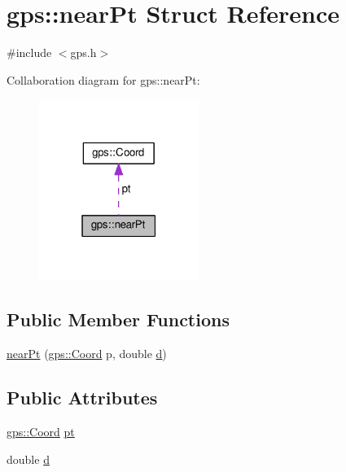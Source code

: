 \hypertarget{structgps_1_1nearPt}{}\section{gps\+:\+:near\+Pt Struct Reference}
\label{structgps_1_1nearPt}


{\ttfamily \#include $<$gps.\+h$>$}



Collaboration diagram for gps\+:\+:near\+Pt\+:\nopagebreak
\begin{figure}[H]
\begin{center}
\leavevmode
\includegraphics[width=147pt]{structgps_1_1nearPt__coll__graph}
\end{center}
\end{figure}
\subsection*{Public Member Functions}
\begin{DoxyCompactItemize}
\item 
\hyperlink{structgps_1_1nearPt_a2a719f92056ca65f9cb7047970e2cf47}{near\+Pt} (\hyperlink{classgps_1_1Coord}{gps\+::\+Coord} p, double \hyperlink{structgps_1_1nearPt_a82eeb1e4d61f5df14e20565b2f6da32e}{d})
\end{DoxyCompactItemize}
\subsection*{Public Attributes}
\begin{DoxyCompactItemize}
\item 
\hyperlink{classgps_1_1Coord}{gps\+::\+Coord} \hyperlink{structgps_1_1nearPt_ab6d2b7e5d5e67891cd83bf2d5ae3ecb9}{pt}
\item 
double \hyperlink{structgps_1_1nearPt_a82eeb1e4d61f5df14e20565b2f6da32e}{d}
\end{DoxyCompactItemize}


